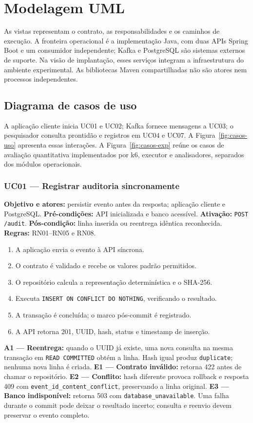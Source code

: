 \section{Modelagem UML}
\label{sec:uml}
As vistas representam o contrato, as responsabilidades e os caminhos de execução. A fronteira operacional é a implementação Java, com duas APIs Spring Boot e um consumidor independente; Kafka e PostgreSQL são sistemas externos de suporte. Na visão de implantação, esses serviços integram a infraestrutura do ambiente experimental. As bibliotecas Maven compartilhadas não são atores nem processos independentes.

\subsection{Diagrama de casos de uso}
A aplicação cliente inicia UC01 e UC02; Kafka fornece mensagens a UC03; o pesquisador consulta prontidão e registros em UC04 e UC07. A Figura~\ref{fig:casos-uso} apresenta essas interações. A Figura~\ref{fig:casos-exp} reúne os casos de avaliação quantitativa implementados por k6, executor e analisadores, separados dos módulos operacionais.


\subsubsection{UC01 --- Registrar auditoria sincronamente}
\textbf{Objetivo e atores:} persistir evento antes da resposta; aplicação cliente e PostgreSQL.
\textbf{Pré-condições:} API inicializada e banco acessível.
\textbf{Ativação:} \texttt{POST /audit}.
\textbf{Pós-condição:} linha inserida ou reentrega idêntica reconhecida.
\textbf{Regras:} RN01--RN05 e RN08.
\begin{enumerate}
\item A aplicação envia o evento à API síncrona.
\item O contrato é validado e recebe os valores padrão permitidos.
\item O repositório calcula a representação determinística e o SHA-256.
\item Executa \texttt{INSERT ON CONFLICT DO NOTHING}, verificando o resultado.
\item A transação é concluída; o marco pós-commit é registrado.
\item A API retorna 201, UUID, hash, status e timestamp de inserção.
\end{enumerate}
\textbf{A1 --- Reentrega:} quando o UUID já existe, uma nova consulta na mesma transação em \texttt{READ COMMITTED} obtém a linha. Hash igual produz \texttt{duplicate}; nenhuma nova linha é criada.
\textbf{E1 --- Contrato inválido:} retorna 422 antes de chamar o repositório.
\textbf{E2 --- Conflito:} hash diferente provoca rollback e resposta 409 com \texttt{event\_id\_content\_conflict}, preservando a linha original.
\textbf{E3 --- Banco indisponível:} retorna 503 com \texttt{database\_unavailable}. Uma falha durante o commit pode deixar o resultado incerto; consulta e reenvio devem preservar o evento completo.

